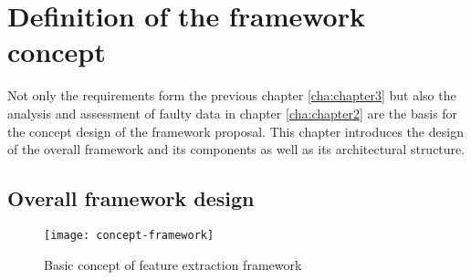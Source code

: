 \chapter{Definition of the framework concept\label{cha:chapter4}}

Not only the requirements form the previous chapter \ref{cha:chapter3} but also the analysis and assessment of faulty data in chapter \ref{cha:chapter2} are the basis for the concept design of the framework proposal. This chapter introduces the design of the overall framework and its components as well as its architectural structure.

\section{Overall framework design \label{sec:overalldesign}}

\begin{figure}[htb]
  \centering
  \texttt{[image: concept-framework]}\\
  \caption{Basic concept of feature extraction framework}
  \label{fig:basicconcept}
\end{figure}

